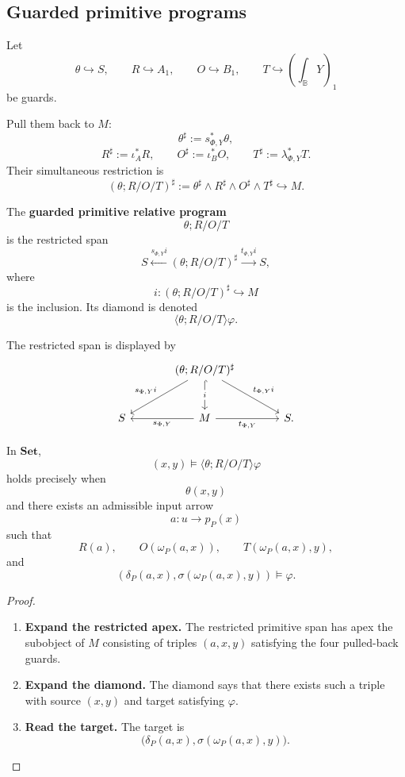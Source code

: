 \subsection{Guarded primitive programs}
\label{subsec:poly-relative-guarded-primitives}

Let
\[
\theta\hookrightarrow S,
\qquad
R\hookrightarrow A_1,
\qquad
O\hookrightarrow B_1,
\qquad
T\hookrightarrow\left(\int_{\mathbb B}Y\right)_1
\]
be guards.

Pull them back to \(M\):
\[
\theta^\sharp:=s_{\Phi,Y}^\ast\theta,
\]
\[
R^\sharp:=\iota_A^\ast R,
\qquad
O^\sharp:=\iota_B^\ast O,
\qquad
T^\sharp:=\lambda_{\Phi,Y}^\ast T.
\]
Their simultaneous restriction is
\[
(\theta;R/O/T)^\sharp
:=
\theta^\sharp\wedge R^\sharp\wedge O^\sharp\wedge T^\sharp
\hookrightarrow M.
\]

\begin{definition}
\label{def:poly-relative-guarded-primitive}
The \textbf{guarded primitive relative program}
\[
\theta;R/O/T
\]
is the restricted span
\[
S
\xleftarrow{s_{\Phi,Y}i}
(\theta;R/O/T)^\sharp
\xrightarrow{t_{\Phi,Y}i}
S,
\]
where
\[
i:(\theta;R/O/T)^\sharp\hookrightarrow M
\]
is the inclusion.  Its diamond is denoted
\[
\langle\theta;R/O/T\rangle\varphi.
\]
\end{definition}

The restricted span is displayed by
\[
\begin{tikzcd}[column sep=large,row sep=large]
&
(\theta;R/O/T)^\sharp
  \arrow[dl,"s_{\Phi,Y}i"']
  \arrow[dr,"t_{\Phi,Y}i"]
  \arrow[d,hook,"i" description]
&
\\
S
&
M
  \arrow[l,"s_{\Phi,Y}"]
  \arrow[r,"t_{\Phi,Y}"']
&
S .
\end{tikzcd}
\]

\begin{proposition}
\label{prop:poly-relative-guarded-primitive-external}
In \(\mathbf{Set}\),
\[
(x,y)\models\langle\theta;R/O/T\rangle\varphi
\]
holds precisely when
\[
\theta(x,y)
\]
and there exists an admissible input arrow
\[
a:u\to p_P(x)
\]
such that
\[
R(a),
\qquad
O(\omega_P(a,x)),
\qquad
T(\omega_P(a,x),y),
\]
and
\[
\left(
\delta_P(a,x),
\sigma(\omega_P(a,x),y)
\right)
\models\varphi.
\]
\end{proposition}

\begin{proof}
\leavevmode
\begin{enumerate}
\item \textbf{Expand the restricted apex.}
The restricted primitive span has apex the subobject of \(M\) consisting of
triples \((a,x,y)\) satisfying the four pulled-back guards.

\item \textbf{Expand the diamond.}
The diamond says that there exists such a triple with source \((x,y)\) and
target satisfying \(\varphi\).

\item \textbf{Read the target.}
The target is
\[
\bigl(
\delta_P(a,x),
\sigma(\omega_P(a,x),y)
\bigr).
\]
\end{enumerate}
\end{proof}


